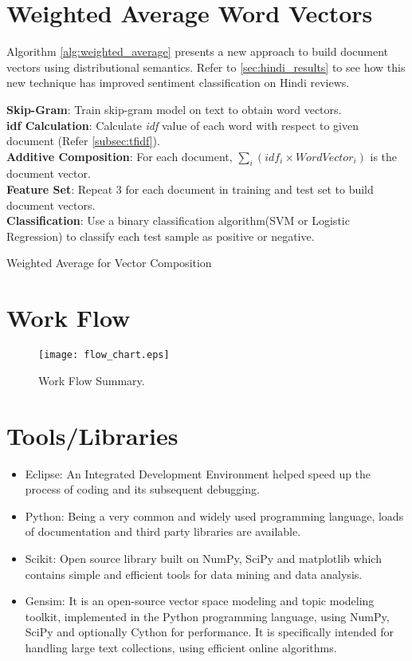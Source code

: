\section{Weighted Average Word Vectors}
Algorithm \ref{alg:weighted_average} presents a new approach to build document vectors using distributional semantics. Refer to \ref{sec:hindi_results} to see how this new technique has improved sentiment classification on Hindi reviews.
\LinesNumbered
\begin{algorithm}[ht!]
\large
\textbf{Skip-Gram}: Train skip-gram model on text to obtain word vectors.\\
\textbf{idf Calculation}: Calculate \emph{idf} value of each word with respect to given document (Refer \ref{subsec:tfidf}).\\
\textbf{Additive Composition}: For each document, $\sum_{i}(idf_i \times WordVector_i)$ is the document vector.\\
\textbf{Feature Set}: Repeat 3 for each document in training and test set to build document vectors.\\
\textbf{Classification}: Use a binary classification algorithm(SVM or Logistic Regression) to classify each test sample as positive or negative.
\caption{Weighted Average for Vector Composition\label{alg:weighted_average}}
\end{algorithm}

\section{Work Flow}
\begin{figure}[ht!]
\centering
\texttt{[image: flow\_chart.eps]}
\caption{Work Flow Summary. \label{fig:flow_chart}}
\end{figure}


\section{Tools/Libraries}
\begin{itemize}
	\item Eclipse: An Integrated Development Environment helped speed up the process of coding and its subsequent debugging.
	\item Python: Being a very common and widely used programming language, loads of  documentation and third party libraries are available.
	\item Scikit: Open source library built on NumPy, SciPy and matplotlib which contains simple and efficient tools for data mining and data analysis.
	\item Gensim: It is an open-source vector space modeling and topic modeling toolkit, implemented in the Python programming language, using NumPy, SciPy and optionally Cython for performance. It is specifically intended for handling large text collections, using efficient online algorithms.
\end{itemize}
